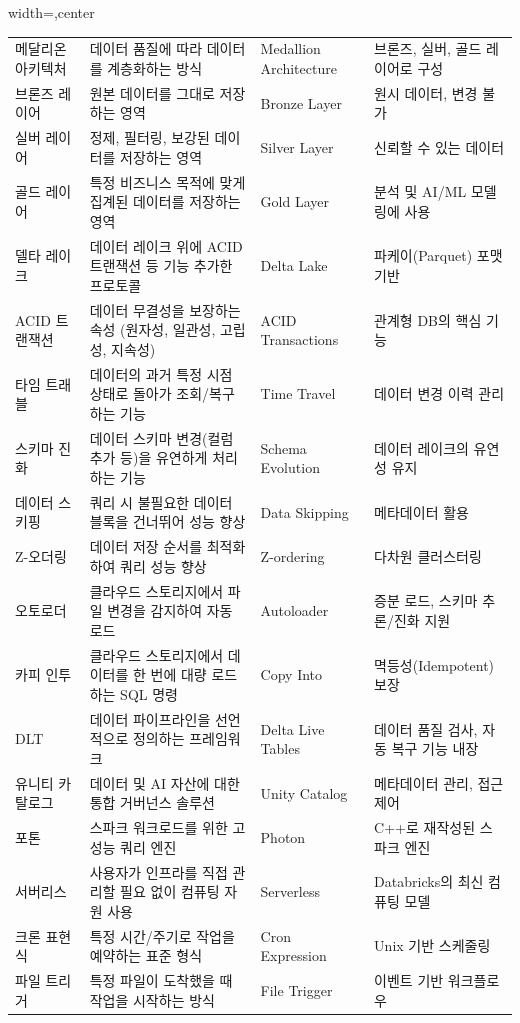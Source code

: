 \documentclass[11pt,a4paper]{article}
\begin{document}
\begin{tcolorbox}[title=\textbf{핵심 용어집}, colback=blue!5!white, colframe=blue!75!black, sharp corners, boxrule=0.8pt]
\begin{adjustbox}{width=\textwidth,center}
\begin{tabular}{llll}
\midrule
메달리온 아키텍처 & 데이터 품질에 따라 데이터를 계층화하는 방식 & Medallion Architecture & 브론즈, 실버, 골드 레이어로 구성 \\
브론즈 레이어 & 원본 데이터를 그대로 저장하는 영역 & Bronze Layer & 원시 데이터, 변경 불가 \\
실버 레이어 & 정제, 필터링, 보강된 데이터를 저장하는 영역 & Silver Layer & 신뢰할 수 있는 데이터 \\
골드 레이어 & 특정 비즈니스 목적에 맞게 집계된 데이터를 저장하는 영역 & Gold Layer & 분석 및 AI/ML 모델링에 사용 \\
\midrule
델타 레이크 & 데이터 레이크 위에 ACID 트랜잭션 등 기능 추가한 프로토콜 & Delta Lake & 파케이(Parquet) 포맷 기반 \\
ACID 트랜잭션 & 데이터 무결성을 보장하는 속성 (원자성, 일관성, 고립성, 지속성) & ACID Transactions & 관계형 DB의 핵심 기능 \\
타임 트래블 & 데이터의 과거 특정 시점 상태로 돌아가 조회/복구하는 기능 & Time Travel & 데이터 변경 이력 관리 \\
스키마 진화 & 데이터 스키마 변경(컬럼 추가 등)을 유연하게 처리하는 기능 & Schema Evolution & 데이터 레이크의 유연성 유지 \\
데이터 스키핑 & 쿼리 시 불필요한 데이터 블록을 건너뛰어 성능 향상 & Data Skipping & 메타데이터 활용 \\
Z-오더링 & 데이터 저장 순서를 최적화하여 쿼리 성능 향상 & Z-ordering & 다차원 클러스터링 \\
\midrule
오토로더 & 클라우드 스토리지에서 파일 변경을 감지하여 자동 로드 & Autoloader & 증분 로드, 스키마 추론/진화 지원 \\
카피 인투 & 클라우드 스토리지에서 데이터를 한 번에 대량 로드하는 SQL 명령 & Copy Into & 멱등성(Idempotent) 보장 \\
DLT & 데이터 파이프라인을 선언적으로 정의하는 프레임워크 & Delta Live Tables & 데이터 품질 검사, 자동 복구 기능 내장 \\
유니티 카탈로그 & 데이터 및 AI 자산에 대한 통합 거버넌스 솔루션 & Unity Catalog & 메타데이터 관리, 접근 제어 \\
포톤 & 스파크 워크로드를 위한 고성능 쿼리 엔진 & Photon & C++로 재작성된 스파크 엔진 \\
서버리스 & 사용자가 인프라를 직접 관리할 필요 없이 컴퓨팅 자원 사용 & Serverless & Databricks의 최신 컴퓨팅 모델 \\
\midrule
크론 표현식 & 특정 시간/주기로 작업을 예약하는 표준 형식 & Cron Expression & Unix 기반 스케줄링 \\
파일 트리거 & 특정 파일이 도착했을 때 작업을 시작하는 방식 & File Trigger & 이벤트 기반 워크플로우 \\

\end{tabular}
\end{adjustbox}
\end{tcolorbox}
\end{document}
